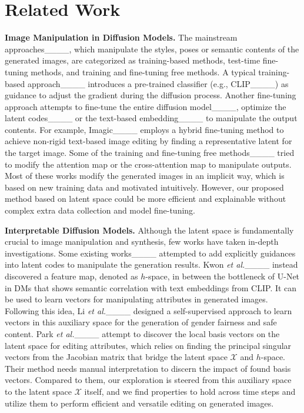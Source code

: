 \section{Related Work}

\textbf{Image Manipulation in Diffusion Models.} The mainstream approaches____, which manipulate the styles, poses or semantic contents of the generated images, are categorized as training-based methods, test-time fine-tuning methods, and training and fine-tuning free methods. A typical training-based approach____ introduces a pre-trained classifier (e.g., CLIP____) as guidance to adjust the gradient during the diffusion process. Another fine-tuning approach attempts to fine-tune the entire diffusion model____, optimize the latent codes____ or the text-based embedding____ to manipulate the output contents. For example, Imagic____ employs a hybrid fine-tuning method to achieve non-rigid text-based image editing by finding a representative latent for the target image. Some of the training and fine-tuning free methods____ tried to modify the attention map or the cross-attention map to manipulate outputs. Most of these works modify the generated images in an implicit way, which is based on new training data and motivated intuitively. However, our proposed method based on latent space could be more efficient and explainable without complex extra data collection and model fine-tuning. %

\textbf{Interpretable Diffusion Models.} Although the latent space is fundamentally crucial to image manipulation and synthesis, few works have taken in-depth investigations. Some existing works____ attempted to add explicitly guidances into latent codes to manipulate the generation results. Kwon \textit{et al.}____ instead discovered a feature map, denoted as $h$-space, in between the bottleneck of U-Net in DMs that shows semantic correlation with text embeddings from CLIP. It can be used to learn vectors for manipulating attributes in generated images. Following this idea, Li \textit{et al.}____ designed a self-supervised approach to learn vectors in this auxiliary space for the generation of gender fairness and safe content. Park \textit{et al.}____ attempt to discover the local basis vectors on the latent space for editing attributes, which relies on finding the principal singular vectors from the Jacobian matrix that bridge the latent space $\mathcal{X}$ and $h$-space. Their method needs manual interpretation to discern the impact of found basis vectors. Compared to them, our exploration is steered from this auxiliary space to the latent space $\mathcal{X}$ itself, and we find properties to hold across time steps and utilize them to perform efficient and versatile editing on generated images.


